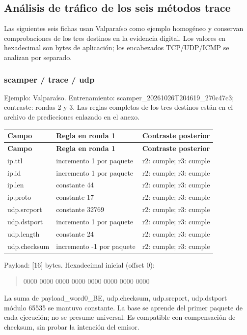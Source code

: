 \subsection{Análisis de tráfico de los seis métodos trace}\label{sec:trace-patrones}
Las siguientes seis fichas usan Valparaíso como ejemplo homogéneo y conservan comprobaciones de los tres destinos en la evidencia digital. Los valores en hexadecimal son bytes de aplicación; los encabezados TCP/UDP/ICMP se analizan por separado.

\subsubsection{scamper / trace / udp}
Ejemplo: Valparaíso. Entrenamiento: scamper\_\allowbreak{}20261026T204619\_\allowbreak{}270c47c3; contraste: rondas 2 y 3. Las reglas completas de los tres destinos están en el archivo de predicciones enlazado en el anexo.

\begingroup
\fontsize{9}{11}\selectfont
\addtocounter{table}{-1}
\begin{longtable}{p{3.1cm}p{5.8cm}p{5.1cm}}
\toprule
\textbf{Campo} & \textbf{Regla en ronda 1} & \textbf{Contraste posterior} \\ \midrule
\endfirsthead
\toprule
\textbf{Campo} & \textbf{Regla en ronda 1} & \textbf{Contraste posterior} \\ \midrule
\endhead
ip.ttl & incremento 1 por paquete & r2: cumple; r3: cumple \\
ip.id & incremento 1 por paquete & r2: cumple; r3: cumple \\
ip.len & constante 44 & r2: cumple; r3: cumple \\
ip.proto & constante 17 & r2: cumple; r3: cumple \\
udp.srcport & constante 32769 & r2: cumple; r3: cumple \\
udp.dstport & incremento 1 por paquete & r2: cumple; r3: cumple \\
udp.length & constante 24 & r2: cumple; r3: cumple \\
udp.checksum & incremento -1 por paquete & r2: cumple; r3: cumple \\
\bottomrule
\end{longtable}
\endgroup
Payload: [16] bytes. Hexadecimal inicial (offset 0):

\begin{quote}\ttfamily\footnotesize\raggedright 0000 0000 0000 0000 0000 0000 0000 0000\end{quote}
La suma de payload\_\allowbreak{}word0\_\allowbreak{}BE, udp.checksum, udp.srcport, udp.dstport módulo 65535 se mantuvo constante. La base se aprende del primer paquete de cada ejecución; no se presume universal. Es compatible con compensación de checksum, sin probar la intención del emisor.

